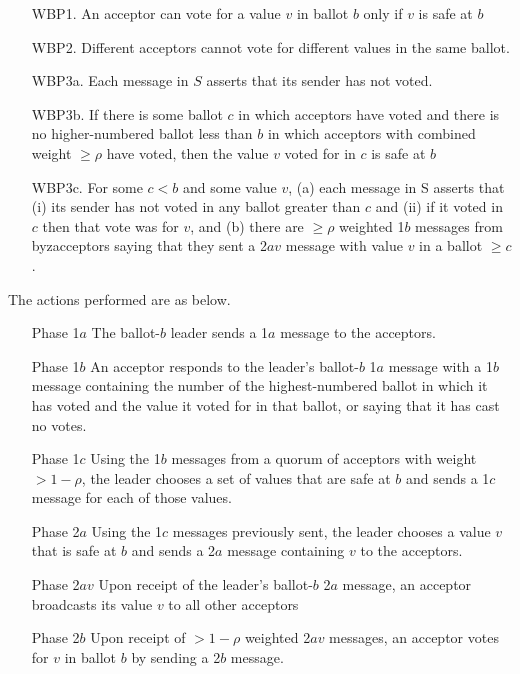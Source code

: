 \documentclass[conference]{IEEEtran}
\begin{document}
\smallskip
\begin{enumerate}[leftmargin=4em]
\item[WBP1.] An acceptor can vote for a value $v$ in ballot $b$ only if $v$ is safe at $b$
\item[WBP2.] Different acceptors cannot vote for different values in the same ballot.
\item[WBP3a.] Each message in $S$ asserts that its sender has not voted.
\item[WBP3b.] If there is some ballot $c$ in which acceptors have voted and there is no higher-numbered ballot less than $b$ in which acceptors with combined weight $\geq \rho$ have voted, then the value $v$ voted for in $c$ is safe at $b$
\item[WBP3c.] For some $c < b$ and some value $v$, (a) each message in S asserts that (i) its sender has not voted in any ballot greater than $c$ and (ii) if it voted in $c$ then that vote was for $v$, and (b) there are $\geq \rho$ weighted 1$b$ messages from byzacceptors saying that they sent a 2$av$ message with value $v$ in a ballot $\geq c$.
\end{enumerate}
\smallskip

The actions performed are as below.

\begin{enumerate}[leftmargin=5em]
\item[Phase 1$a$] The ballot-$b$ leader sends a 1$a$ message to the acceptors.
\item[Phase 1$b$] An acceptor responds to the leader’s ballot-$b$ 1$a$ message with a 1$b$ message containing the number of the highest-numbered ballot in which it has voted and the value it voted for in that ballot, or saying that it has cast no votes.
\item[Phase 1$c$] Using the 1$b$ messages from a quorum of acceptors with weight $> 1 - \rho$, the leader chooses a set of values that are safe at $b$ and sends a 1$c$ message for each of those values.
\end{enumerate}
\smallskip

\begin{enumerate}[leftmargin=5em]
\item[Phase 2$a$] Using the 1$c$ messages previously sent, the leader chooses a value $v$ that is safe at $b$ and sends a 2$a$ message containing $v$ to the acceptors.
\item[Phase 2$av$] Upon receipt of the leader's ballot-$b$ 2$a$ message, an acceptor broadcasts its value $v$ to all other acceptors
\item[Phase 2$b$] Upon receipt of $> 1 - \rho$ weighted 2$av$ messages, an acceptor votes for $v$ in ballot $b$ by sending a 2$b$ message.
\end{enumerate}
\smallskip
\end{document}
